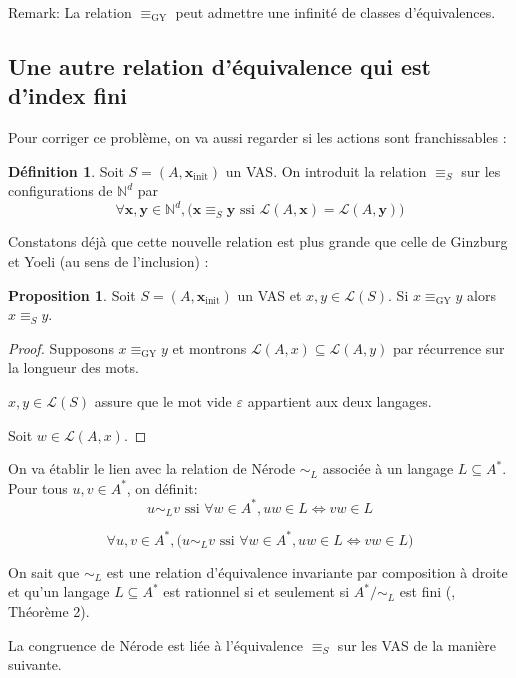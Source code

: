 \documentclass[a4paper,final]{article}
\theoremstyle{definition}
\newtheorem{Definition}[Theorem]{Définition}
\newtheorem{Proposition}[Theorem]{Proposition}
\let\epsilon\varepsilon
\newcommand{\N}{\ensuremath{\mathbb{N}}}
\newcommand{\lang}{\ensuremath{\mathcal{L}}}
\newcommand{\vect}[1]{\ensuremath{\mathbf{#1}}}
\newcommand{\rel}{\ensuremath{\equiv}}
\newcommand{\relGY}{\ensuremath{\equiv_\text{GY}}}
\newcommand{\ssi}{\ensuremath{\text{ ssi }}}
\newcommand{\equivaut}{\ensuremath{\Leftrightarrow}}
\newcommand{\xinit}{\ensuremath{\vect{x}_\text{init}}}
\begin{document}
Remark: La relation $\relGY$ peut admettre une infinité de classes d'équivalences.

\subsection{Une autre relation d'équivalence qui est d'index fini}
Pour corriger ce problème, on va aussi regarder si les actions sont franchissables :

\begin{Definition}
Soit $S=(A,\xinit)$ un VAS. On introduit la relation $\rel_S$ sur les configurations de $\N^d$ par
$$\forall \vect{x},\vect{y}\in\N^d, \Big(
\vect{x} \rel_S \vect{y} \ssi \lang(A,\vect{x}) = \lang(A,\vect{y}) \Big)$$
\end{Definition}


Constatons déjà que cette nouvelle relation est plus grande que celle de Ginzburg et Yoeli (au sens de l'inclusion) :

\begin{Proposition}
Soit $S=(A,\xinit)$ un VAS et $x,y\in\lang(S)$.
Si $x\relGY y$ alors $x\rel_S y$.
\end{Proposition}

\begin{proof}
Supposons $x\relGY y$ et montrons $\lang(A,x)\subseteq \lang(A,y)$ par récurrence sur la longueur des mots.

$x,y\in\lang(S)$ assure que le mot vide $\epsilon$ appartient aux deux langages.

Soit $w\in\lang(A,x)$.
\end{proof}

On va établir le lien avec la relation de Nérode $\sim_L$ associée à un langage $L \subseteq A^*$. Pour tous $u,v\in A^\ast$, on définit: 
 $$ u\sim_L v \ssi \forall w\in A^\ast, uw\in L \equivaut vw\in L $$

 $$\forall u,v\in A^\ast, \Big( u\sim_L v \ssi \forall w\in A^\ast, uw\in L \equivaut vw\in L \Big)$$

On sait que $\sim_L$ est une relation d'équivalence invariante par composition à droite et qu'un langage $L \subseteq A^*$ est rationnel si et seulement si $A^*/\sim_L$ est fini (\cite{rasc59}, Théorème 2).


La congruence de Nérode est liée à l'équivalence $ \rel_S$ sur les VAS de la manière suivante.
\end{document}
